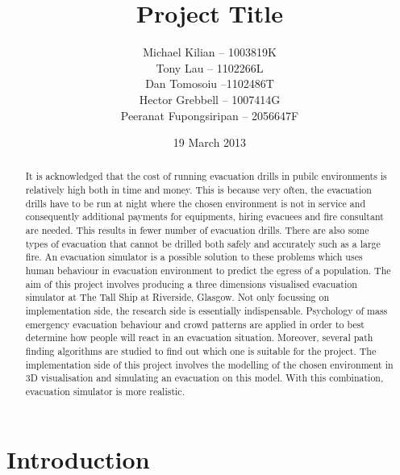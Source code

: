 \documentclass{l3proj}
\begin{document}
\title{Project Title}
\author{Michael Kilian -- 1003819K \\
        Tony Lau -- 1102266L\\
        Dan Tomosoiu --1102486T \\
        Hector Grebbell -- 1007414G \\
        Peeranat Fupongsiripan -- 2056647F}
\date{19 March 2013}
\maketitle

\begin{abstract}
It is acknowledged that the cost of 
running evacuation drills in pubilc environments is relatively high both in time and money. This is because very often, the 
evacuation drills have to be run at night where the chosen environment is not in service and consequently additional payments for 
equipments, hiring evacuees and fire consultant are needed. This results in fewer number of evacuation drills. 
There are also some types of evacuation that cannot be drilled both safely and accurately such as a large fire.
An evacuation simulator is a possible solution to these problems which uses human behaviour in evacuation environment 
to predict the egress of a population. The aim of this project involves producing a three dimensions visualised 
evacuation simulator at The Tall Ship at Riverside, Glasgow. Not only focussing on implementation side, the research 
side is essentially indispensable. Psychology of mass emergency evacuation behaviour and crowd patterns are applied in 
order to best determine how people will react in an evacuation situation. Moreover, several path finding algorithms 
are studied to find out which one is suitable for the project.
The implementation side of this project 
involves the modelling of the chosen environment in 3D visualisation and simulating an evacuation on this model.
With this combination, evacuation simulator is more realistic.
\end{abstract}

\educationalconsent
\tableofcontents
\chapter{Introduction}
\label{introduction}



\end{document}
